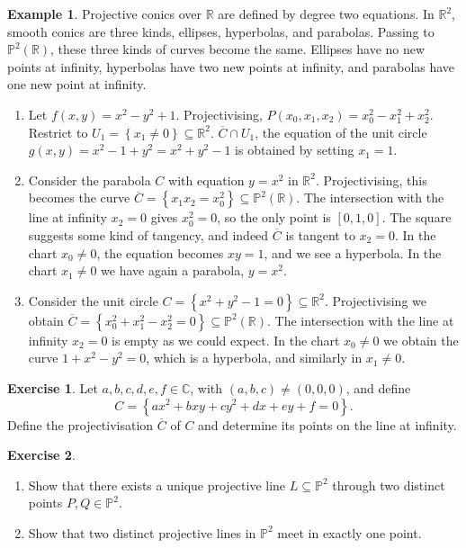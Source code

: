 \documentclass{article}
\newcommand{\R}{\mathbb{R}}
\newcommand{\C}{\mathbb{C}}
\renewcommand{\P}{\mathbb{P}}
\newcommand{\rb}[1]{\left( #1 \right)}
\renewcommand{\sb}[1]{\left[ #1 \right]}
\newcommand{\cb}[1]{\left\{ #1 \right\}}
\theoremstyle{definition}\newtheorem{definition}{Definition}[section]
\theoremstyle{definition}\newtheorem{notation}[definition]{Notation}
\theoremstyle{definition}\newtheorem{remark}[definition]{Remark}
\theoremstyle{definition}\newtheorem{example}[definition]{Example}
\theoremstyle{definition}\newtheorem{fact}{Fact}
\theoremstyle{definition}\newtheorem{exercise}{Exercise}
\begin{document}
\begin{example}
Projective conics over $ \R $ are defined by degree two equations. In $ \R^2 $, smooth conics are three kinds, ellipses, hyperbolas, and parabolas. Passing to $ \P^2\rb{\R} $, these three kinds of curves become the same. Ellipses have no new points at infinity, hyperbolas have two new points at infinity, and parabolas have one new point at infinity.
\begin{enumerate}
\item Let $ f\rb{x, y} = x^2 - y^2 + 1 $. Projectivising, $ P\rb{x_0, x_1, x_2} = x_0^2 - x_1^2 + x_2^2 $. Restrict to $ U_1 = \cb{x_1 \ne 0} \subseteq \R^2 $. $ \overline{C} \cap U_1 $, the equation of the unit circle $ g\rb{x, y} = x^2 - 1 + y^2 = x^2 + y^2 - 1 $ is obtained by setting $ x_1 = 1 $.
\item Consider the parabola $ C $ with equation $ y = x^2 $ in $ \R^2 $. Projectivising, this becomes the curve $ \overline{C} = \cb{x_1x_2 = x_0^2} \subseteq \P^2\rb{\R} $. The intersection with the line at infinity $ x_2 = 0 $ gives $ x_0^2 = 0 $, so the only point is $ \sb{0, 1, 0} $. The square suggests some kind of tangency, and indeed $ \overline{C} $ is tangent to $ x_2 = 0 $. In the chart $ x_0 \ne 0 $, the equation becomes $ xy = 1 $, and we see a hyperbola. In the chart $ x_1 \ne 0 $ we have again a parabola, $ y = x^2 $.
\item Consider the unit circle $ C = \cb{x^2 + y^2 - 1 = 0} \subseteq \R^2 $. Projectivising we obtain $ \overline{C} = \cb{x_0^2 + x_1^2 - x_2^2 = 0} \subseteq \P^2\rb{\R} $. The intersection with the line at infinity $ x_2 = 0 $ is empty as we could expect. In the chart $ x_0 \ne 0 $ we obtain the curve $ 1 + x^2 - y^2 = 0 $, which is a hyperbola, and similarly in $ x_1 \ne 0 $.
\end{enumerate}
\end{example}

\begin{exercise}
Let $ a, b, c, d, e, f \in \C $, with $ \rb{a, b, c} \ne \rb{0, 0, 0} $, and define
$$ C = \cb{ax^2 + bxy + cy^2 + dx + ey + f = 0}. $$
Define the projectivisation $ \overline{C} $ of $ C $ and determine its points on the line at infinity.
\end{exercise}

\begin{exercise}
\hfill
\begin{enumerate}
\item Show that there exists a unique projective line $ L \subseteq \P^2 $ through two distinct points $ P, Q \in \P^2 $.
\item Show that two distinct projective lines in $ \P^2 $ meet in exactly one point.
\end{enumerate}
\end{exercise}
\end{document}
